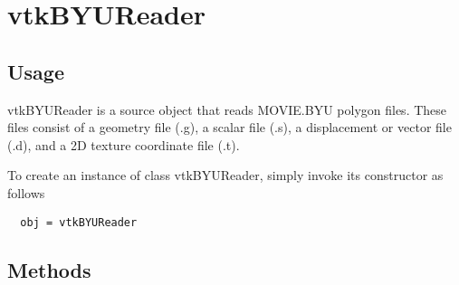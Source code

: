 \section{vtkBYUReader}

\subsection{Usage}

 vtkBYUReader is a source object that reads MOVIE.BYU polygon files.
 These files consist of a geometry file (.g), a scalar file (.s), a 
 displacement or vector file (.d), and a 2D texture coordinate file
 (.t).

To create an instance of class vtkBYUReader, simply
invoke its constructor as follows
\begin{verbatim}
  obj = vtkBYUReader
\end{verbatim}
\subsection{Methods}

